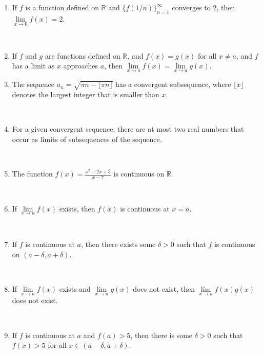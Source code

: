 \documentclass[12pt]{amsart}
\def\d{\delta}
\newcommand{\R}{{\mathbb{R}}}
\numberwithin{equation}{section}
\theoremstyle{plain} %
\theoremstyle{definition}
\theoremstyle{remark}
\begin{document}
\begin{enumerate}
 \
 
 \item  If $f$ is a function defined on $\R$ and $\{ f(1/n) \}_{n=1}^\infty$ converges to $2$, then
 ${\lim\limits_{x\to 0} f(x)=2}$.
 
 \
 

	
	\item If $f$ and $g$ are functions defined on $\R$, and $f(x)=g(x)$ for all $x\neq a$, and $f$ has a limit as $x$ approaches $a$, then $\lim\limits_{x\to a} f(x) = \lim\limits_{x\to a} g(x)$.
	
	 
 
 \item  The sequence $a_n =\sqrt{\pi n - \lfloor \pi n\rfloor}$ has a convergent subsequence, where $\lfloor x \rfloor$ denotes the largest integer that is smaller than $x$.
 
 \
 

 
 \item  For a given convergent sequence,  there are at most two real numbers that occur as limits of subsequences of the sequence.
 
 \

 
	 
	 \item  The function $\displaystyle f(x) = \frac{x^2 - 2x + 3}{x-7}$ is continuous on $\R$.
	 
	 \
	 

	 
	 \item  If $\lim\limits_{x\to a} f(x)$ exists, then $f(x)$ is continuous at $x=a$.
	 
	 \
	 

	 
	 \item  If $f$ is continuous at $a$, then there exists some $\d>0$ such that $f$ is continuous on $(a-\d, a+\d)$.
	 
	 \
	 
	 	\item If $\lim\limits_{x\to a} f(x)$ exists and $\lim\limits_{x\to a} g(x)$ does not exist, then $\lim\limits_{x\to a} f(x)  g(x)$ does not exist.
	
	\

	 
	 	 \item  If $f$ is continuous at $a$ and $f(a)>5$, then there is some $\delta>0$ such that $f(x)>5 $ for all $x\in (a-\delta,a+\delta)$.
	 
	 \
	 


\end{enumerate}
\end{document}
